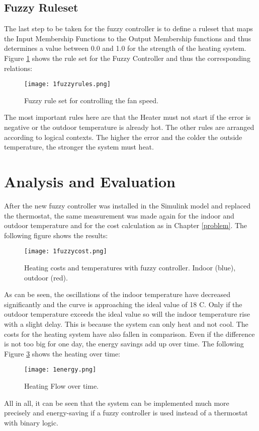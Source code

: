 \subsection{Fuzzy Ruleset}
The last step to be taken for the fuzzy controller is to define a ruleset that maps the Input Membership Functions to the Output Membership functions and thus determines a value between 0.0 and 1.0 for the strength of the heating system. Figure \ref{fuzzyrules} shows the rule set for the Fuzzy Controller and thus the corresponding relations:
\begin{figure}[H]
	\centering
	\texttt{[image: 1fuzzyrules.png]}
	\caption[Caption for LOF]{Fuzzy rule set for controlling the fan speed.}
	\label{fuzzyrules}
\end{figure}
The most important rules here are that the Heater must not start if the error is negative or the outdoor temperature is already hot. The other rules are arranged according to logical contexts. The higher the error and the colder the outside temperature, the stronger the system must heat.
\section{Analysis and Evaluation}
After the new fuzzy controller was installed in the Simulink model and replaced the thermostat, the same measurement was made again for the indoor and outdoor temperature and for the cost calculation as in Chapter \ref{problem}. The following figure shows the results:
\begin{figure}[H]
	\centering
	\texttt{[image: 1fuzzycost.png]}
	\caption[Caption for LOF]{Heating costs and temperatures with fuzzy controller. Indoor (blue), outdoor (red).}
	\label{fuzzycost}
\end{figure}
As can be seen, the oscillations of the indoor temperature have decreased significantly and the curve is approaching the ideal value of 18 C. Only if the outdoor temperature exceeds the ideal value so will the indoor temperature rise with a slight delay. This is because the system can only heat and not cool. The costs for the heating system have also fallen in comparison. Even if the difference is not too big for one day, the energy savings add up over time. The following Figure \ref{energy} shows the heating over time:
\begin{figure}[H]
	\centering
	\texttt{[image: 1energy.png]}
	\caption[Caption for LOF]{Heating Flow over time.}
	\label{energy}
\end{figure}
All in all, it can be seen that the system can be implemented much more precisely and energy-saving if a fuzzy controller is used instead of a thermostat with binary logic.
